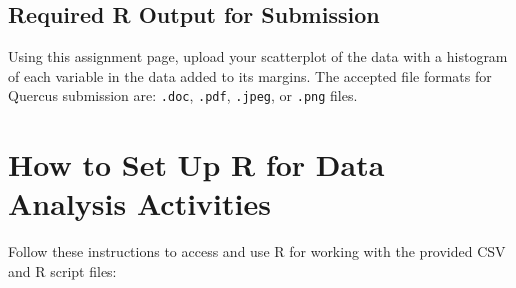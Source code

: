 \documentclass[oneside,openany]{book}
\begin{document}
\section{Required R Output for Submission}\label{required-r-output-for-submission-6}

Using this assignment page, upload your scatterplot of the data with a histogram of each variable in the data added to its margins. The accepted file formats for Quercus submission are: \texttt{.doc}, \texttt{.pdf}, \texttt{.jpeg}, or \texttt{.png} files.

\chapter{How to Set Up R for Data Analysis Activities}\label{how-to-set-up-r-for-data-analysis-activities}

Follow these instructions to access and use R for working with the provided CSV and R script files:
\end{document}
